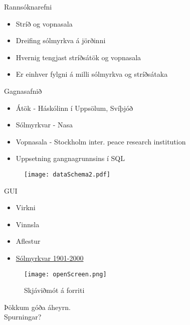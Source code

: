 \documentclass{rubeamer}
\begin{document}
\rutitleframe{}


\begin{frame}{Rannsóknarefni}
	\begin{itemize}
		\item Stríð og vopnasala 
		\item Dreifing sólmyrkva á jörðinni
		\item Hvernig tengjast stríðsátök og vopnasala
		\item Er einhver fylgni á milli sólmyrkva og stríðsátaka
		
	\end{itemize}
\end{frame}

\begin{frame}{Gagnasafnið}
	
	\begin{itemize}
		\item Átök - Háskólinn í Uppsölum, Svíþjóð \cite{conflict}
		\item Sólmyrkvar - Nasa \cite{Eclipse}
		\item Vopnasala - Stockholm inter. peace research institution \cite{weapon}
		\item Uppsetning gangnagrunnsins í SQL
	\end{itemize}
	
	\begin{figure}
		\centering
		\texttt{[image: dataSchema2.pdf]}
	\end{figure}
\end{frame}

\begin{frame}{GUI}
	\begin{itemize}
		\item Virkni \cite{qt4} \cite{basemap}
		\item Vinnsla \cite{Qdarkstyle}
		\item Aflestur
		\item \href{file:///C:/haukur/skoli/5.onn/gagnavinnsla/Gagnavinnsla.git/trunk/lokaverkefni/kynning/graphics/SpinningGlobe.gif}{Sólmyrkvar 1901-2000} \cite{moviepy}
	\end{itemize}
	\begin{figure}
		\centering
		\texttt{[image: openScreen.png]}
		\caption*{Skjáviðmót á forriti}
	\end{figure}
\end{frame}

	
\begin{frame}
	\centering
	Þökkum góða áheyrn. \\
	Spurningar?\\
\end{frame}

\bibframe
\end{document}

